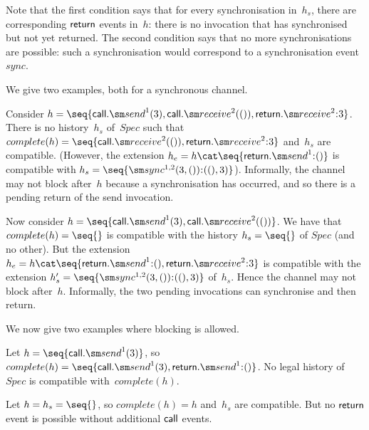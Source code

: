 Note that the first condition says that for every synchronisation in~$h_s$,
there are corresponding $\mathsf{return}$ events in~$h$: there is no invocation that
has synchronised but not yet returned.  The second condition says that no more
synchronisations are possible: such a synchronisation would correspond to a
synchronisation event~$sync$.


We give two examples, both for a synchronous channel.
%
\begin{example}
Consider $h = \seq{ \call.\send^1(3), \call.\receive^2(()),
  \return.\receive^2\::3 }$.  There is no history~$h_s$ of~$Spec$ such that
$complete(h) = \seq{\call.\receive^2(()),\linebreak[1] \return.\receive^2\::3
}$ and~$h_s$ are compatible.  (However, the extension $h_e = h \cat \seq{
  \return.\send^1 \:: () }$ is compatible with $h_s =
\seq{\sync^{1,2}(3,())\::((),3) }$).  Informally, the channel may not block
after~$h$ because a synchronisation has occurred, and so there is a pending
return of the send invocation.
\end{example}

\begin{example}
Now consider $h = \seq{\call.\send^1(3), \call.\receive^2(())}$.  We have that
$complete(h) = \seq{}$ is compatible with the history $h_s = \seq{}$ of $Spec$
(and no other). But the extension $h_e = h \cat
\seq{\return.\send^1\::(),\linebreak[1] \return.\receive^2\::3}$ is compatible
with the extension $h_s' = \linebreak[1] \seq{\sync^{1,2}(3,()) \:: ((),3)}$
of~$h_s$.  Hence the channel may not block after~$h$.  Informally, the two
pending invocations can synchronise and then return. 
\end{example}

We now give two examples where blocking is allowed.
%
\begin{example}  
Let $h = \seq{\call.\send^1(3)}$, so $complete(h) =
\seq{\call.\send^1(3),\linebreak[1] \return.\send^1\::()}$.  No legal history
of~$Spec$ is compatible with~$complete(h)$.
\end{example}

\begin{example}
Let $h = h_s = \seq{}$,
so $complete(h) = h$ and~$h_s$ are compatible.  But
no $\mathsf{return}$ event is possible without additional $\mathsf{call}$ events.
\end{example}


